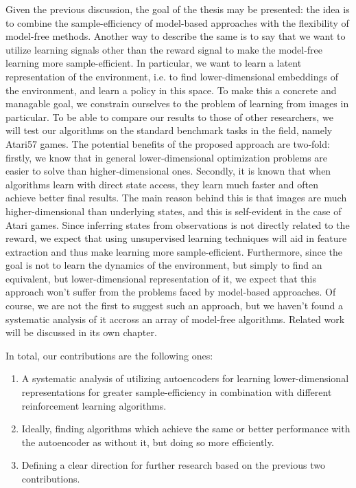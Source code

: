 Given the previous discussion, the goal of the thesis may be presented:
the idea is to combine the sample-efficiency of model-based approaches
with the flexibility of model-free methods.
Another way to describe the same is to say that we want
to utilize learning signals other than the reward signal
to make the model-free learning more sample-efficient.
In particular, we want to learn a latent representation of the environment,
i.e. to find lower-dimensional embeddings of the environment,
and learn a policy in this space.
To make this a concrete and managable goal,
we constrain ourselves to the problem of learning from images in particular.
To be able to compare our results to those of other researchers,
we will test our algorithms on the standard benchmark tasks in the field,
namely Atari57 games.
The potential benefits of the proposed approach are two-fold:
firstly, we know that in general lower-dimensional optimization problems
are easier to solve than higher-dimensional ones.
Secondly, it is known that when algorithms learn with direct state access,
they learn much faster and often achieve better final results.
The main reason behind this is that images are much higher-dimensional
than underlying states, and this is self-evident in the case of Atari games.
Since inferring states from observations is not directly related to the reward,
we expect that using unsupervised learning techniques will aid in feature extraction
and thus make learning more sample-efficient.
Furthermore, since the goal is not to learn the dynamics of the environment,
but simply to find an equivalent, but lower-dimensional representation of it,
we expect that this approach won't suffer from the problems faced
by model-based approaches.
Of course, we are not the first to suggest such an approach,
but we haven't found a systematic analysis of it accross an array of
model-free algorithms.
Related work will be discussed in its own chapter.

In total, our contributions are the following ones:
\begin{enumerate}
	\item A systematic analysis of utilizing autoencoders for learning lower-dimensional
	representations for greater sample-efficiency in combination with different
	reinforcement learning algorithms.
	\item Ideally, finding algorithms which achieve the same or better performance with the autoencoder
	as without it, but doing so more efficiently.
	\item Defining a clear direction for further research based on the previous two contributions.
\end{enumerate}





